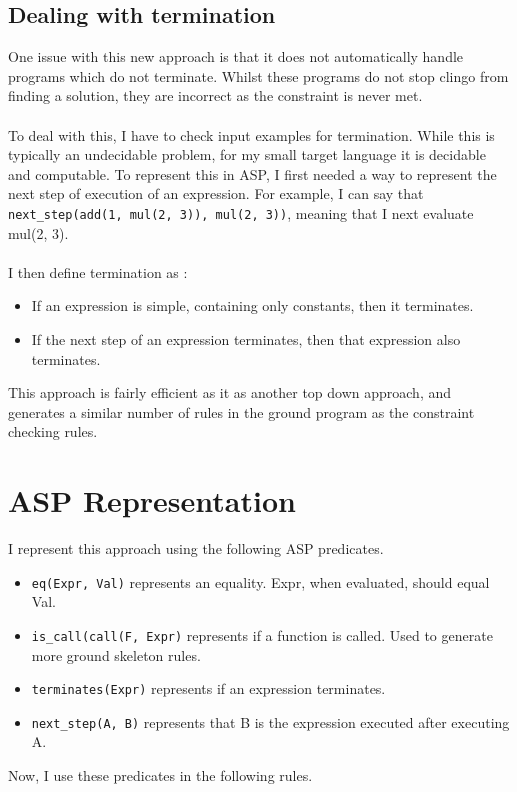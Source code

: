 \subsection{Dealing with termination}
One issue with this new approach is that it does not automatically handle programs which do not terminate. Whilst these programs do not stop clingo from finding a solution, they are incorrect as the constraint is never met. \\ \\
To deal with this, I have to check input examples for termination. While this is typically an undecidable problem, for my small target language it is decidable and computable. To represent this in ASP, I first needed a way to represent the next step of execution of an expression. For example, I can say that \lstinline{next_step(add(1, mul(2, 3)), mul(2, 3))}, meaning that I next evaluate mul(2, 3). \\ \\%
I then define termination as :
\begin{itemize}
\item If an expression is simple, containing only constants, then it terminates.
\item If the next step of an expression terminates, then that expression also terminates.
\end{itemize}

This approach is fairly efficient as it as another top down approach, and generates a similar number of rules in the ground program as the constraint checking rules.

\section{ASP Representation}
I represent this approach using the following ASP predicates.

\begin{itemize}
\item \lstinline{eq(Expr, Val)} represents an equality. Expr, when evaluated, should equal Val.
\item \lstinline{is_call(call(F, Expr)} represents if a function is called. Used to generate more ground skeleton rules.
\item \lstinline{terminates(Expr)} represents if an expression terminates.
\item \lstinline{next_step(A, B)} represents that B is the expression executed after executing A.
\end{itemize}
Now, I use these predicates in the following rules. \\

